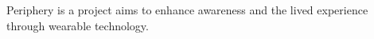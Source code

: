 
Periphery is a project aims to enhance awareness and the lived experience through wearable technology.



